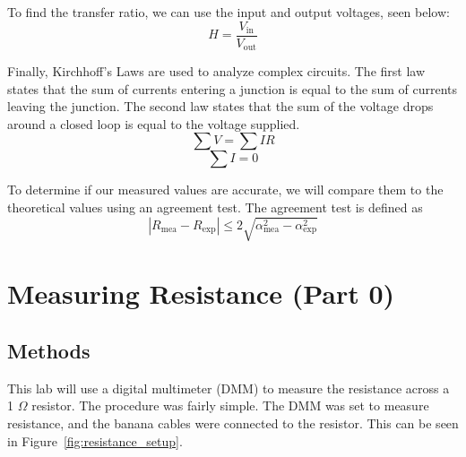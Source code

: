 \documentclass[11pt]{article}
\let\oldsection\section
\renewcommand\section{\clearpage\oldsection}
\begin{document}
    To find the transfer ratio, we can use the input and output voltages, seen below:
    \begin{equation}\label{eq:transfer_ratio}
        H = \frac{V_{\text{in}}}{V_{\text{out}}}
    \end{equation}

    Finally, Kirchhoff's Laws are used to analyze complex circuits.
    The first law states that the sum of currents entering a junction is equal to the sum of currents leaving the junction.
    The second law states that the sum of the voltage drops around a closed loop is equal to the voltage supplied.
    \begin{equation}\label{eq:kirchhoff}
        \sum V = \sum I R
    \end{equation}
    \begin{equation}\label{eq:kirchhoff2}
        \sum I = 0
    \end{equation}

    To determine if our measured values are accurate, we will compare them to the theoretical values using an agreement test.
    The agreement test is defined as
    \begin{equation}\label{eq:agreement_test}
        |R_{\text{mea}} - R_{\exp}| \le 2 \sqrt{\alpha^2_{\text{mea}} -
        \alpha^2_{\exp} }
    \end{equation}


    \section{Measuring Resistance (Part 0)}\label{sec:measuring-resistance}


    \subsection{Methods}\label{subsec:resistance_methods}

    This lab will use a digital multimeter (DMM) to measure the resistance across a 1 $\Omega$ resistor.
    The procedure was fairly simple.
    The DMM was set to measure resistance, and the banana cables were connected to the resistor.
    This can be seen in Figure~\ref{fig:resistance_setup}.
\end{document}
